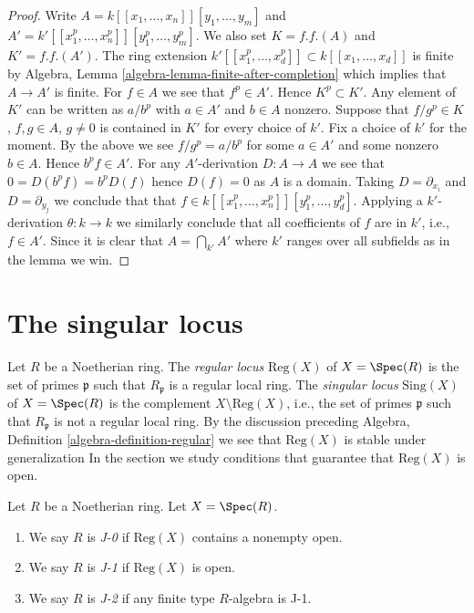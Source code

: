 \begin{proof}
Write $A = k[[x_1, \ldots, x_n]][y_1, \ldots, y_m]$
and $A' = k'[[x_1^p, \ldots, x_n^p]][y_1^p, \ldots, y_m^p]$.
We also set $K = f.f.(A)$ and $K' = f.f.(A')$. The ring extension
$k'[[x_1^p, \ldots, x_d^p]] \subset k[[x_1, \ldots, x_d]]$ is finite
by Algebra, Lemma \ref{algebra-lemma-finite-after-completion}
which implies that $A \to A'$ is finite.
For $f \in A$ we see that $f^p \in A'$. Hence $K^p \subset K'$.
Any element of $K'$ can be written as $a/b^p$ with $a \in A'$ and $b \in A$
nonzero. Suppose that $f/g^p \in K$, $f, g \in A$, $g \not = 0$
is contained in $K'$ for every choice of $k'$.
Fix a choice of $k'$ for the moment. By the above we see
$f/g^p = a/b^p$ for some $a \in A'$ and some nonzero $b \in A$.
Hence $b^p f \in A'$. For any $A'$-derivation $D : A \to A$ we see
that $0 = D(b^pf) = b^p D(f)$ hence $D(f) = 0$ as $A$ is a domain.
Taking $D = \partial_{x_i}$ and $D = \partial_{y_j}$ we conclude that
that $f \in k[[x_1^p, \ldots, x_n^p]][y_1^p, \ldots, y_d^p]$.
Applying a $k'$-derivation $\theta : k \to k$
we similarly conclude that all coefficients of $f$ are in $k'$, i.e.,
$f \in A'$. Since it is clear that
$A = \bigcap\nolimits_{k'} A'$ where $k'$ ranges over all subfields
as in the lemma we win.
\end{proof}





\section{The singular locus}
\label{section-singular-locus}

\noindent
Let $R$ be a Noetherian ring. The {\it regular locus} $\text{Reg}(X)$
of $X = \Spec(R)$ is the set of primes $\mathfrak p$ such that
$R_\mathfrak p$ is a regular local ring. The {\it singular locus}
$\text{Sing}(X)$ of $X = \Spec(R)$ is the complement
$X \setminus \text{Reg}(X)$, i.e., the set of primes $\mathfrak p$ such that
$R_\mathfrak p$ is not a regular local ring. By the discussion preceding
Algebra, Definition \ref{algebra-definition-regular}
we see that $\text{Reg}(X)$ is stable under generalization
In the section we study conditions that guarantee that $\text{Reg}(X)$
is open.

\begin{definition}
\label{definition-J}
Let $R$ be a Noetherian ring. Let $X = \Spec(R)$.
\begin{enumerate}
\item We say $R$ is {\it J-0} if $\text{Reg}(X)$ contains a nonempty open.
\item We say $R$ is {\it J-1} if $\text{Reg}(X)$ is open.
\item We say $R$ is {\it J-2} if any finite type $R$-algebra is J-1.
\end{enumerate}
\end{definition}

